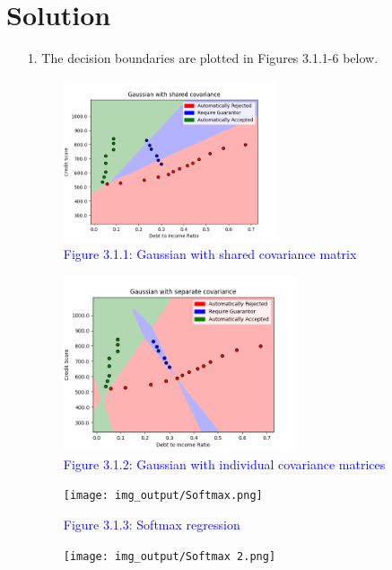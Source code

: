 \documentclass[submit]{../harvardml}
\newenvironment{solution}
  {\color{blue}\section*{Solution}}
{}
\begin{document}
\begin{solution}

\begin{enumerate}
    \item[1.] The decision boundaries are plotted in Figures 3.1.1-6 below.
    \begin{figure}[H]
        \centering
        \includegraphics[width=0.6\textwidth]{img_output/Gaussian with shared covariance.png}
        \caption*{\textcolor{blue}{Figure 3.1.1: Gaussian with shared covariance matrix}}
        \label{fig:q3.1a}
    \end{figure}
    \begin{figure}[H]
        \centering
        \includegraphics[width=0.65\textwidth]{img_output/Gaussian with separate covariance.png}
        \caption*{\textcolor{blue}{Figure 3.1.2: Gaussian with individual covariance matrices}}
        \label{fig:q3.1b}
    \end{figure}
    \begin{figure}[H]
        \centering
        \texttt{[image: img\_output/Softmax.png]}
        \caption*{\textcolor{blue}{Figure 3.1.3: Softmax regression}}
        \label{fig:q3.1c}
    \end{figure}
    \begin{figure}[H]
        \centering
        \texttt{[image: img\_output/Softmax 2.png]}

\end{figure}
\end{enumerate}
\end{solution}
\end{document}
